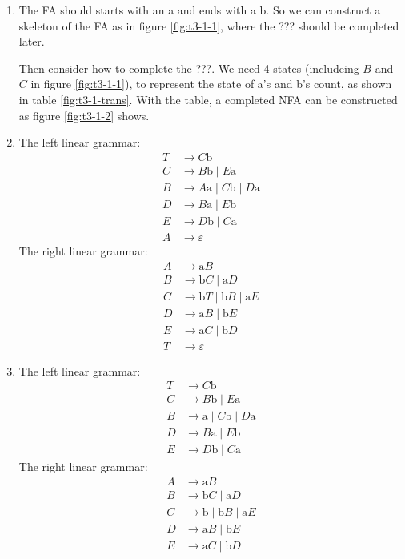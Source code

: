 \documentclass[scheme=plain,12pt]{ctexart}
\newcommand{\red}[1]{{\color{red}#1}}
\begin{document}
    \begin{enumerate}
        \item The FA should starts with an a and ends with a b. So we can construct a skeleton of the FA as in figure \ref{fig:t3-1-1}, where the \red{???} should be completed later.
        
        Then consider how to complete the \red{???}. We need 4 states (includeing $B$ and $C$ in figure \ref{fig:t3-1-1}), to represent the state of a's and b's count, as shown in table \ref{fig:t3-1-trans}. With the table, a completed NFA can be constructed as figure \ref{fig:t3-1-2} shows.
        \item The left linear grammar:
        \begin{align*}
            T &\to C\mathrm{b} \\
            C &\to B\mathrm{b}\;|\;E\mathrm{a} \\
            B &\to A\mathrm{a}\;|\;C\mathrm{b}\;|\;D\mathrm{a} \\
            D &\to B\mathrm{a}\;|\;E\mathrm{b} \\
            E &\to D\mathrm{b}\;|\;C\mathrm{a} \\
            A &\to \varepsilon
        \end{align*}
        The right linear grammar:
        \begin{align*}
            A &\to \mathrm{a}B \\
            B &\to \mathrm{b}C\;|\;\mathrm{a}D \\
            C &\to \mathrm{b}T\;|\;\mathrm{b}B\;|\;\mathrm{a}E \\
            D &\to \mathrm{a}B\;|\;\mathrm{b}E \\
            E &\to \mathrm{a}C\;|\;\mathrm{b}D \\
            T &\to \varepsilon
        \end{align*}
        \item The left linear grammar:
        \begin{align*}
            T &\to C\mathrm{b} \\
            C &\to B\mathrm{b}\;|\;E\mathrm{a} \\
            B &\to \mathrm{a}\;|\;C\mathrm{b}\;|\;D\mathrm{a} \\
            D &\to B\mathrm{a}\;|\;E\mathrm{b} \\
            E &\to D\mathrm{b}\;|\;C\mathrm{a}
        \end{align*}
        The right linear grammar:
        \begin{align*}
            A &\to \mathrm{a}B \\
            B &\to \mathrm{b}C\;|\;\mathrm{a}D \\
            C &\to \mathrm{b}\;|\;\mathrm{b}B\;|\;\mathrm{a}E \\
            D &\to \mathrm{a}B\;|\;\mathrm{b}E \\
            E &\to \mathrm{a}C\;|\;\mathrm{b}D \\
        \end{align*}
    \end{enumerate}
\end{document}
